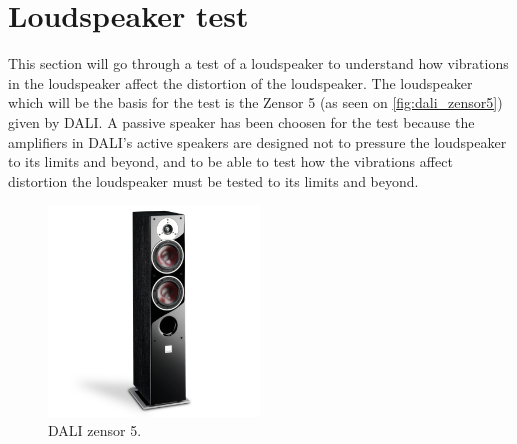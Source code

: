 \section{Loudspeaker test}
This section will go through a test of a loudspeaker to understand how vibrations in the loudspeaker affect the distortion of the loudspeaker.
The loudspeaker which will be the basis for the test is the Zensor 5 (as seen on \autoref{fig:dali_zensor5}) given by DALI. A passive speaker has been choosen for the test because the amplifiers in DALI's active speakers are designed not to pressure the loudspeaker to its limits and beyond, and to be able to test how the vibrations affect distortion the loudspeaker must be tested to its limits and beyond.

\begin{figure}[H]
\centering
\includegraphics[width=0.5\textwidth]{figures/zensor5.png}
\caption{DALI zensor 5.}
\label{fig:dali_zensor5}
\end{figure}



